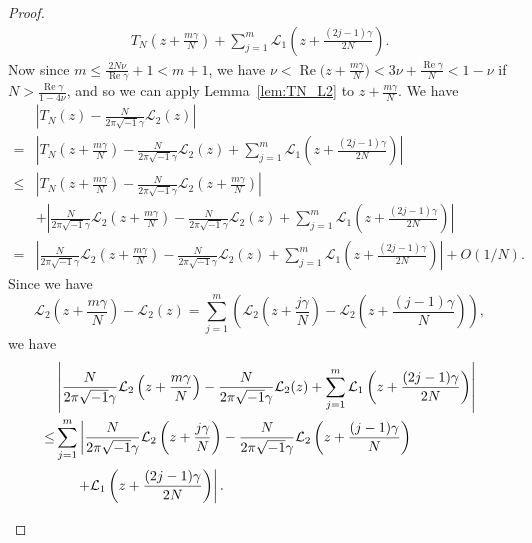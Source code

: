 \documentclass[10pt,a4paper]{amsart}
\renewcommand{\L}{\mathcal{L}}
\renewcommand{\Re}{\operatorname{Re}}
\renewcommand{\i}{\sqrt{-1}}
\begin{document}
\begin{proof}
\begin{equation*}
\begin{split}
  T_{N}\left(z+\frac{m\gamma}{N}\right)
  +
  \sum_{j=1}^{m}\L_1\left(z+\frac{(2j-1)\gamma}{2N}\right).
\end{split}
\end{equation*}
Now since $m\le\frac{2N\nu}{\Re\gamma}+1<m+1$, we have $\nu<\Re\bigl(z+\frac{m\gamma}{N}\bigr)<3\nu+\frac{\Re\gamma}{N}<1-\nu$ if $N>\frac{\Re\gamma}{1-4\nu}$, and so we can apply Lemma~\ref{lem:TN_L2} to $z+\frac{m\gamma}{N}$.
We have
\begin{align*}
  &\left|
    T_{N}(z)-\frac{N}{2\pi\i\gamma}\L_2(z)
  \right|
  \\
  =&
  \left|
    T_{N}\left(z+\frac{m\gamma}{N}\right)
    -
    \frac{N}{2\pi\i\gamma}\L_2(z)
    +
    \sum_{j=1}^{m}\L_1\left(z+\frac{(2j-1)\gamma}{2N}\right)
  \right|
  \\
  \le&
  \left|
    T_{N}\left(z+\frac{m\gamma}{N}\right)
    -
    \frac{N}{2\pi\i\gamma}\L_2\left(z+\frac{m\gamma}{N}\right)
  \right|
  \\
  &+
  \left|
    \frac{N}{2\pi\i\gamma}\L_2\left(z+\frac{m\gamma}{N}\right)
    -
    \frac{N}{2\pi\i\gamma}\L_2(z)
    +
    \sum_{j=1}^{m}\L_1\left(z+\frac{(2j-1)\gamma}{2N}\right)
  \right|
  \\
  =&
  \left|
    \frac{N}{2\pi\i\gamma}\L_2\left(z+\frac{m\gamma}{N}\right)
    -
    \frac{N}{2\pi\i\gamma}\L_2(z)
    +
    \sum_{j=1}^{m}\L_1\left(z+\frac{(2j-1)\gamma}{2N}\right)
  \right|
  +O(1/N).
\end{align*}
Since we have
\begin{equation*}
  \L_2\left(z+\frac{m\gamma}{N}\right)-\L_2(z)
  =
  \sum_{j=1}^{m}
  \left(
    \L_2\left(z+\frac{j\gamma}{N}\right)
    -
    \L_2\left(z+\frac{(j-1)\gamma}{N}\right)
  \right),
\end{equation*}
we have
\begin{equation}\label{eq:sum_L2_L1}
\begin{split}
  &\left|
    \frac{N}{2\pi\i\gamma}\L_2\left(z+\frac{m\gamma}{N}\right)
    -
    \frac{N}{2\pi\i\gamma}\L_2(z)
    +
    \sum_{j=1}^{m}\L_1\left(z+\frac{(2j-1)\gamma}{2N}\right)
  \right|
  \\
  \le&
  \sum_{j=1}^{m}
  \left|
    \frac{N}{2\pi\i\gamma}\L_2\left(z+\frac{j\gamma}{N}\right)
    -
    \frac{N}{2\pi\i\gamma}\L_2\left(z+\frac{(j-1)\gamma}{N}\right)
  \right.
  \\
  &
  \phantom{\sum_{j=1}^{m}}\hfill
  \left.
    +
    \L_1\left(z+\frac{(2j-1)\gamma}{2N}\right)
  \right|.
\end{split}
\end{equation}

\end{proof}
\end{document}
